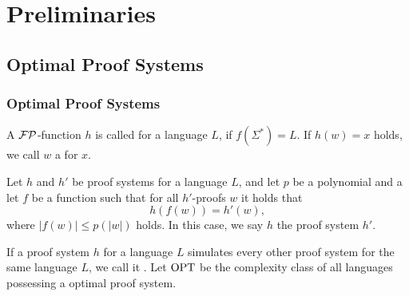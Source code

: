 \section{Preliminaries} 
\subsection{Optimal Proof Systems}

\begin{frame}
  \frametitle{Optimal Proof Systems}
  
   A \(\mathcal{FP}\)-function \(h\) is called  for a language \(L\), if \(f(\Sigma^*) = L\).
   If \(h(w) = x\) holds, we call \(w\) a  for \(x\).
  
   Let \(h\) and \(h'\) be proof systems for a language \(L\),
   and let \(p\) be a polynomial and a let \(f\) be a function
   such that for all \(h'\)-proofs \(w\) it holds that \[ h(f(w)) = h'(w), \]
   where \(|f(w)| \leq p(|w|)\) holds.
   In this case, we say \(h\)  the proof system \(h'\).
  
   If a proof system \(h\) for a language \(L\) simulates every other proof system for the same language \(L\), we call it .
   Let \(\text{OPT}\) be the complexity class of all languages possessing a optimal proof system.
\end{frame}

